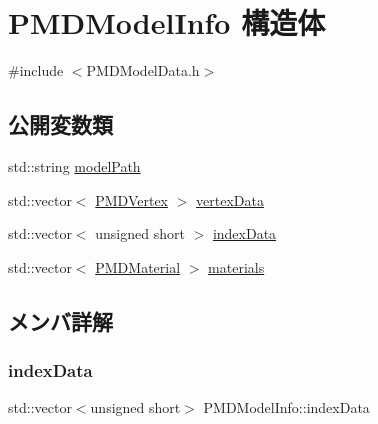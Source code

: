 \hypertarget{struct_p_m_d_model_info}{}\section{P\+M\+D\+Model\+Info 構造体}
\label{struct_p_m_d_model_info}


{\ttfamily \#include $<$P\+M\+D\+Model\+Data.\+h$>$}

\subsection*{公開変数類}
\begin{DoxyCompactItemize}
\item 
std\+::string \mbox{\hyperlink{struct_p_m_d_model_info_a756ac77e858d04d751c7bf4bc01f22d7}{model\+Path}}
\item 
std\+::vector$<$ \mbox{\hyperlink{struct_p_m_d_vertex}{P\+M\+D\+Vertex}} $>$ \mbox{\hyperlink{struct_p_m_d_model_info_a2862ab3d4b00b5600723eed89b4888ab}{vertex\+Data}}
\item 
std\+::vector$<$ unsigned short $>$ \mbox{\hyperlink{struct_p_m_d_model_info_a84f1297444562cd6012f13b45d988759}{index\+Data}}
\item 
std\+::vector$<$ \mbox{\hyperlink{struct_p_m_d_material}{P\+M\+D\+Material}} $>$ \mbox{\hyperlink{struct_p_m_d_model_info_ae9e41e468da41dd38df7f39243050def}{materials}}
\end{DoxyCompactItemize}


\subsection{メンバ詳解}
\mbox{\label{struct_p_m_d_model_info_a84f1297444562cd6012f13b45d988759}} 
\subsubsection{\texorpdfstring{index\+Data}{indexData}}
{\footnotesize\ttfamily std\+::vector$<$unsigned short$>$ P\+M\+D\+Model\+Info\+::index\+Data}

\mbox{\label{struct_p_m_d_model_info_ae9e41e468da41dd38df7f39243050def}} 
